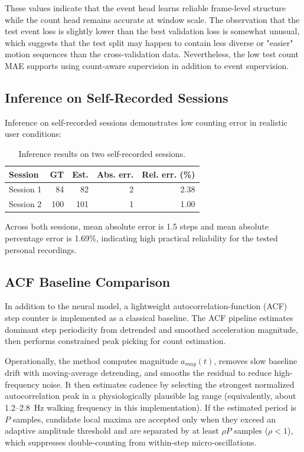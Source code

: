 These values indicate that the event head learns reliable frame-level structure while the count head remains accurate at window scale. The observation that the test event loss is slightly lower than the best validation loss is somewhat unusual, which suggests that the test split may happen to contain less diverse or "easier" motion sequences than the cross-validation data. Nevertheless, the low test count MAE supports using count-aware supervision in addition to event supervision.

\subsection{Inference on Self-Recorded Sessions}
Inference on self-recorded sessions demonstrates low counting error in realistic user conditions:
\begin{table}[H]
\centering
\caption{Inference results on two self-recorded sessions.}
\label{tab:self_results}
\small
\begin{tabular}{lrrrr}
\toprule
Session & GT & Est. & Abs. err. & Rel. err. (\%) \\
\midrule
Session 1 & 84 & 82 & 2 & 2.38 \\
Session 2 & 100 & 101 & 1 & 1.00 \\
\bottomrule
\end{tabular}
\end{table}

Across both sessions, mean absolute error is 1.5 steps and mean absolute percentage error is 1.69\%, indicating high practical reliability for the tested personal recordings.

\subsection{ACF Baseline Comparison}
In addition to the neural model, a lightweight autocorrelation-function (ACF) step counter is implemented as a classical baseline. The ACF pipeline estimates dominant step periodicity from detrended and smoothed acceleration magnitude, then performs constrained peak picking for count estimation.

Operationally, the method computes magnitude $a_{mag}(t)$, removes slow baseline drift with moving-average detrending, and smooths the residual to reduce high-frequency noise. It then estimates cadence by selecting the strongest normalized autocorrelation peak in a physiologically plausible lag range (equivalently, about 1.2--2.8~Hz walking frequency in this implementation). If the estimated period is $P$ samples, candidate local maxima are accepted only when they exceed an adaptive amplitude threshold and are separated by at least $\rho P$ samples ($\rho<1$), which suppresses double-counting from within-step micro-oscillations.

